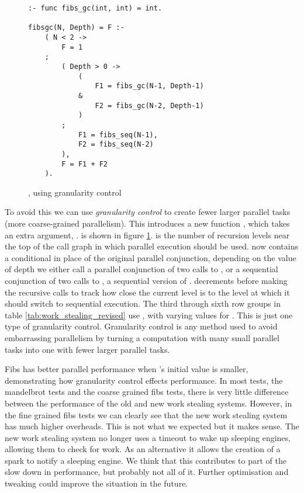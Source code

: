 \begin{figure}
\begin{verbatim}
:- func fibs_gc(int, int) = int.

fibsgc(N, Depth) = F :-
    ( N < 2 ->
        F = 1
    ;
        ( Depth > 0 ->
            (
                F1 = fibs_gc(N-1, Depth-1)
            &
                F2 = fibs_gc(N-2, Depth-1)
            )
        ;
            F1 = fibs_seq(N-1),
            F2 = fibs_seq(N-2)
        ),
        F = F1 + F2
    ).
\end{verbatim}
\caption{\fibsgc, \fibs using granularity control}
\label{fig:fibsgc}
\end{figure}

To avoid this we can use \emph{granularity control} to create fewer larger
parallel tasks (more coarse-grained parallelism).
This introduces a new function \fibsgc, which takes an extra argument,
\Depth.
\fibsgc is shown in figure \ref{fig:fibsgc}.
\Depth is the number of recursion levels near the top of the call graph in
which parallel execution should be used.
\fibsgc now contains a conditional in place of the original parallel
conjunction,
depending on the value of depth we either call a parallel conjunction of two
calls to \fibsgc,
or a sequential conjunction of two calls to \fibsseq, a sequential version of
\fibs.
\fibsgc decrements \Depth before making the recursive calls to track how
close the current level is to the level at which it should switch to
sequential execution.
The third through sixth row groups in table
\ref{tab:work_stealing_revised} use \fibsgc, with varying values for
\Depth.
This is just one type of granularity control.
Granularity control is any method used to avoid
embarrassing parallelism by turning a computation with 
many small parallel tasks into one with fewer larger parallel tasks.

Fibs has better parallel performance when \Depth's initial value is
smaller,
demonstrating how granularity control effects performance.
In most tests,
the mandelbrot tests and the coarse grained fibs tests,
there is very little difference between the performance of the old and new
work stealing systems.
However,
in the fine grained fibs tests we can clearly see that the new work stealing
system has much higher overheads.
This is not what we expected but it makes sense.
The new work stealing system no longer uses a timeout to wake up sleeping
engines, allowing them to check for work.
As an alternative it allows the creation of a spark to notify a sleeping
engine.
We think that this contributes to part of the slow down in performance,
but probably not all of it.
Further optimisation and tweaking could improve the situation in the future.

